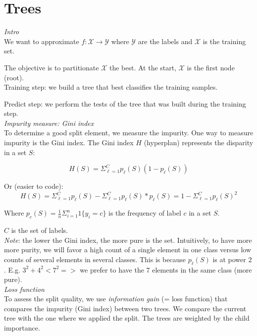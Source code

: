 \section*{Trees}

\label{sec:trees}

\vspace{5mm}

\textit{Intro} \\

We want to approximate $f: \mathcal{X} \to \mathcal{Y}$ where $\mathcal{Y}$ are the labels and $\mathcal{X}$ is the training set.

The objective is to partitionate $\mathcal{X}$ the best. At the start, $\mathcal{X}$ is the first node (root). \\

Training step: we build a tree that best classifies the training samples.

Predict step: we perform the tests of the tree that was built during the training step. \\

\textit{Impurity measure: Gini index} \\

To determine a good split element, we measure the impurity. One way to measure impurity is the Gini index. The Gini index $H$ (hyperplan) represents the disparity in a set $S$:

$$H(S)=\Sigma_{\ell=1}^C p_{\ell}(S)(1-p_{\ell}(S))$$

Or (easier to code): 
$$H(S)=\Sigma_{\ell=1}^C p_{\ell}(S)-\Sigma_{\ell=1}^C p_{\ell}(S)*p_{\ell}(S)=1-\Sigma_{\ell=1}^C p_{\ell}(S)^2$$

Where $p_{c}(S)=\frac{1}{n}\Sigma_{i=1}^n 1\{y_i=c\}$ is the frequency of label $c$ in a set $S$.

$C$ is the set of labels. \\

\textit{Note}: the lower the Gini index, the more pure is the set. Intuitively, to have more more purity, we will favor a high count of a single element in one class versus low counts of several elements in several classes. This is because $p_{\ell}(S)$ is at power $2$. E.g. $3^2 + 4^2 < 7^2 =>$ we prefer to have the 7 elements in the same class (more pure).\\

\textit{Loss function} \\

To assess the split quality, we use \textit{information gain} (= loss function) that compares the impurity (Gini index) between two trees. We compare the current tree with the one where we applied the split. The trees are weighted by the child importance.

